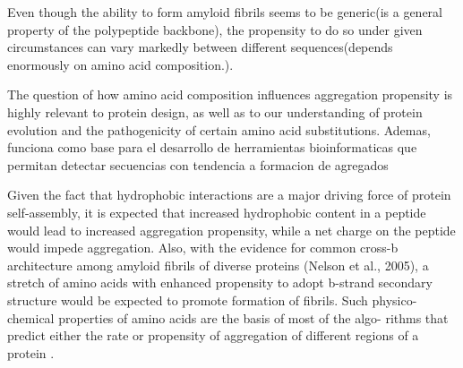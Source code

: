 







Even though the ability to form amyloid fibrils seems to be generic(is a general property of the polypeptide backbone), 
the propensity to do so under given circumstances can vary markedly between different sequences(depends enormously on amino acid composition.).

The question of how amino acid composition influences aggregation propensity is highly relevant to protein design, as well as
to our understanding of protein evolution and the pathogenicity of certain amino acid substitutions.
Ademas, funciona como base para el desarrollo de herramientas bioinformaticas que permitan detectar secuencias con tendencia a formacion de agregados


Given the fact that hydrophobic
interactions are a major driving force of protein self-assembly, it is
expected that increased hydrophobic content in a peptide would
lead to increased aggregation propensity, while a net charge on
the peptide would impede aggregation. Also, with the evidence
for common cross-b architecture among amyloid fibrils of diverse
proteins (Nelson et al., 2005), a stretch of amino acids with
enhanced propensity to adopt b-strand secondary structure
would be expected to promote formation of fibrils. Such physico-
chemical properties of amino acids are the basis of most of the algo-
rithms that predict either the rate or propensity of aggregation of
different regions of a protein .  %

